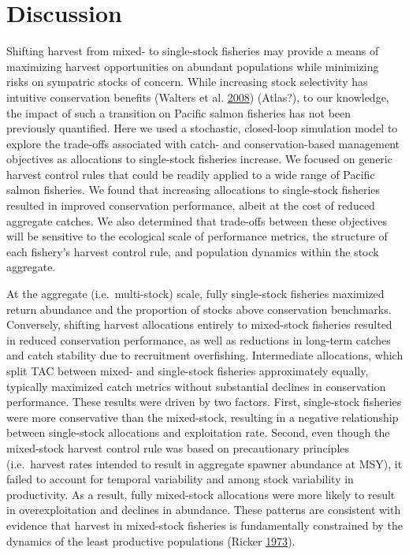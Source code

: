 \documentclass[11pt]{book}
\begin{document}
\section{Discussion}\label{discussion}

Shifting harvest from mixed- to single-stock fisheries may provide a means of maximizing harvest opportunities on abundant populations while minimizing risks on sympatric stocks of concern. While increasing stock selectivity has intuitive conservation benefits (Walters et al. \protect\hyperlink{ref-Walters2008}{2008}) (Atlas?), to our knowledge, the impact of such a transition on Pacific salmon fisheries has not been previously quantified. Here we used a stochastic, closed-loop simulation model to explore the trade-offs associated with catch- and conservation-based management objectives as allocations to single-stock fisheries increase. We focused on generic harvest control rules that could be readily applied to a wide range of Pacific salmon fisheries. We found that increasing allocations to single-stock fisheries resulted in improved conservation performance, albeit at the cost of reduced aggregate catches. We also determined that trade-offs between these objectives will be sensitive to the ecological scale of performance metrics, the structure of each fishery's harvest control rule, and population dynamics within the stock aggregate.

At the aggregate (i.e.~multi-stock) scale, fully single-stock fisheries maximized return abundance and the proportion of stocks above conservation benchmarks. Conversely, shifting harvest allocations entirely to mixed-stock fisheries resulted in reduced conservation performance, as well as reductions in long-term catches and catch stability due to recruitment overfishing. Intermediate allocations, which split TAC between mixed- and single-stock fisheries approximately equally, typically maximized catch metrics without substantial declines in conservation performance. These results were driven by two factors. First, single-stock fisheries were more conservative than the mixed-stock, resulting in a negative relationship between single-stock allocations and exploitation rate. Second, even though the mixed-stock harvest control rule was based on precautionary principles (i.e.~harvest rates intended to result in aggregate spawner abundance at MSY), it failed to account for temporal variability and among stock variability in productivity. As a result, fully mixed-stock allocations were more likely to result in overexploitation and declines in abundance. These patterns are consistent with evidence that harvest in mixed-stock fisheries is fundamentally constrained by the dynamics of the least productive populations (Ricker \protect\hyperlink{ref-Ricker1973}{1973}).
\end{document}
